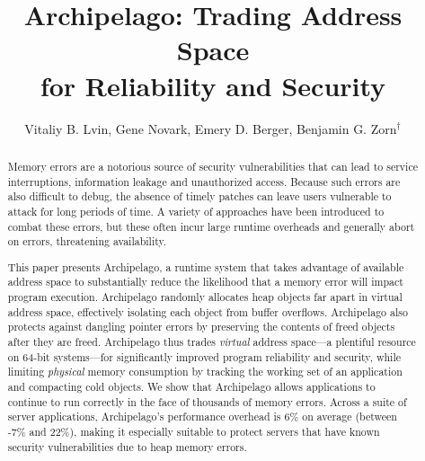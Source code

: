 \documentclass{acm_proc_article-sp}
\begin{document}

\title{Archipelago: Trading Address Space \\ for Reliability and Security}
\author{
\alignauthor
Vitaliy B. Lvin, Gene Novark, Emery D. Berger, Benjamin G. Zorn$^\dag$ \\
{\center \hspace{5em}	 \hfill {} \hspace{5em} } \vspace{-0.4em} %
{\center \hspace{5em}	 \hfill {} \hspace{5em} } \vspace{-0.4em} %
{\center \hspace{5em}	 \hfill {} \hspace{5em} } \vspace{-0.4em} %
}

\maketitle

\begin{abstract}
Memory errors are a notorious source of security vulnerabilities that
can lead to service interruptions, information leakage and
unauthorized access. Because such errors are also difficult to debug,
the absence of timely patches can leave users vulnerable to attack for
long periods of time. A variety of approaches have been introduced to
combat these errors, but these often incur large runtime overheads and
generally abort on errors, threatening availability.

This paper presents Archipelago, a runtime system that takes advantage
of available address space to substantially reduce the likelihood that
a memory error will impact program execution. Archipelago randomly
allocates heap objects far apart in virtual address space, effectively
isolating each object from buffer overflows. Archipelago also protects
against dangling pointer errors by preserving the contents of freed
objects after they are freed. Archipelago thus trades \emph{virtual}
address space---a plentiful resource on 64-bit systems---for
significantly improved program reliability and security, while
limiting
\emph{physical} memory consumption by tracking the working set of an
application and compacting cold objects. We show that Archipelago
allows applications to continue to run correctly in the face of
thousands of memory errors. Across a suite of server applications,
Archipelago's performance overhead is 6\% on average (between -7\% and
22\%), making it especially suitable to protect servers that have
known security vulnerabilities due to heap memory errors.
\end{abstract}
\end{document}

